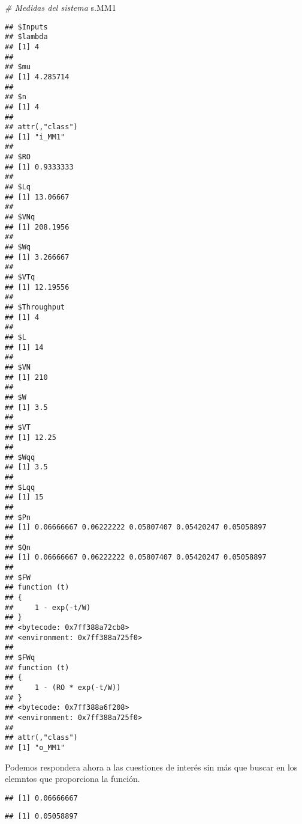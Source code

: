 \documentclass[
]{book}
\newenvironment{Shaded}{\begin{snugshade}}{\end{snugshade}}
\newcommand{\CommentTok}[1]{\textcolor[rgb]{0.56,0.35,0.01}{\textit{#1}}}
\newcommand{\DecValTok}[1]{\textcolor[rgb]{0.00,0.00,0.81}{#1}}
\newcommand{\NormalTok}[1]{#1}
\newcommand{\SpecialCharTok}[1]{\textcolor[rgb]{0.00,0.00,0.00}{#1}}
\theoremstyle{definition}
\theoremstyle{definition}
\theoremstyle{definition}
\theoremstyle{definition}
\theoremstyle{remark}
\begin{document}
\begin{Shaded}
\begin{Highlighting}[]
\CommentTok{\# Medidas del sistema}
\NormalTok{s.MM1}
\end{Highlighting}
\end{Shaded}

\begin{verbatim}
## $Inputs
## $lambda
## [1] 4
## 
## $mu
## [1] 4.285714
## 
## $n
## [1] 4
## 
## attr(,"class")
## [1] "i_MM1"
## 
## $RO
## [1] 0.9333333
## 
## $Lq
## [1] 13.06667
## 
## $VNq
## [1] 208.1956
## 
## $Wq
## [1] 3.266667
## 
## $VTq
## [1] 12.19556
## 
## $Throughput
## [1] 4
## 
## $L
## [1] 14
## 
## $VN
## [1] 210
## 
## $W
## [1] 3.5
## 
## $VT
## [1] 12.25
## 
## $Wqq
## [1] 3.5
## 
## $Lqq
## [1] 15
## 
## $Pn
## [1] 0.06666667 0.06222222 0.05807407 0.05420247 0.05058897
## 
## $Qn
## [1] 0.06666667 0.06222222 0.05807407 0.05420247 0.05058897
## 
## $FW
## function (t) 
## {
##     1 - exp(-t/W)
## }
## <bytecode: 0x7ff388a72cb8>
## <environment: 0x7ff388a725f0>
## 
## $FWq
## function (t) 
## {
##     1 - (RO * exp(-t/W))
## }
## <bytecode: 0x7ff388a6f208>
## <environment: 0x7ff388a725f0>
## 
## attr(,"class")
## [1] "o_MM1"
\end{verbatim}

Podemos respondera ahora a las cuestiones de interés sin más que buscar en los elemntos que proporciona la función.

\begin{Shaded}
\end{Shaded}

\begin{verbatim}
## [1] 0.06666667
\end{verbatim}

\begin{Shaded}
\end{Shaded}

\begin{verbatim}
## [1] 0.05058897
\end{verbatim}
\end{document}
